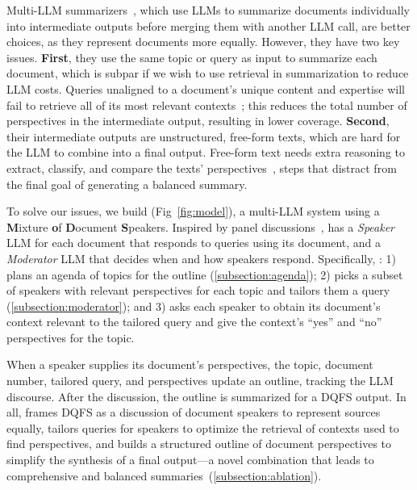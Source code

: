 Multi-LLM summarizers~\cite{chang2024booookscore, adams2023sparse}, which use LLMs to summarize documents individually into intermediate outputs before merging them with another LLM call, are better choices, as they represent documents more equally. 
However, they have two key issues.
\textbf{First}, they use the same topic or query as input to summarize each document, which is subpar if we wish to use retrieval in summarization to reduce LLM costs.
Queries unaligned to a document's unique content and expertise will fail to retrieve all of its most relevant contexts~\cite{sachan2022improving}; this reduces the total number of perspectives in the intermediate output, resulting in lower coverage.
\textbf{Second}, their intermediate outputs are unstructured, free-form texts, which are hard for the LLM to combine into a final output.
Free-form text needs extra reasoning to extract, classify, and compare the texts' perspectives~\cite{barrow2021syntopical}, steps that distract from the final goal of generating a balanced summary.


To solve our issues, we build \textbf{\model} (Fig~\ref{fig:model}), a multi-LLM system using a \textbf{M}ixture \textbf{o}f \textbf{D}ocument \textbf{S}peakers.
Inspired by panel discussions~\cite{doumont2014english}, \model has a \textit{Speaker} LLM for each document that responds to queries using its document, and a \textit{Moderator} LLM that decides when and how speakers respond.
Specifically, \model: 1) plans an agenda of topics for the outline (\cref{subsection:agenda}); 2) picks a subset of speakers with relevant perspectives for each topic and tailors them a query (\cref{subsection:moderator}); and 3) asks each speaker to obtain its document's context relevant to the tailored query and give the context's ``yes'' and ``no'' perspectives for the topic. 

When a speaker supplies its document's perspectives, the topic, document number, tailored query, and perspectives update an outline, tracking the LLM discourse.
After the discussion, the outline is summarized for a DQFS output.
In all, \model frames DQFS as a discussion of document speakers to represent sources equally, tailors queries for speakers to optimize the retrieval of contexts used to find perspectives, and builds a structured outline of document perspectives to simplify the synthesis of a final output---a novel combination that leads to comprehensive and balanced summaries~(\cref{subsection:ablation}).

